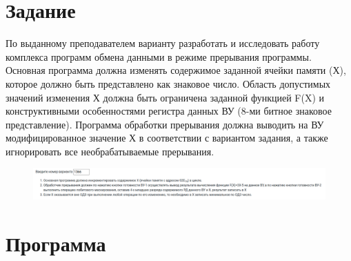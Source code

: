 

\section{Задание}
По выданному преподавателем варианту разработать и исследовать работу комплекса программ обмена данными в режиме
прерывания программы. Основная программа должна изменять содержимое заданной ячейки памяти (Х), которое должно быть
представлено как знаковое число. Область допустимых значений изменения Х должна быть ограничена заданной функцией F(X)
и конструктивными особенностями регистра данных ВУ (8-ми битное знаковое представление). Программа обработки прерывания
должна выводить на ВУ модифицированное значение Х в соответствии с вариантом задания, а также игнорировать все необрабатываемые прерывания.\\


\begin{figure}[H]
    \centering
    \includegraphics[scale=0.3]{img/variant}
\end{figure}


\section{Программа}

